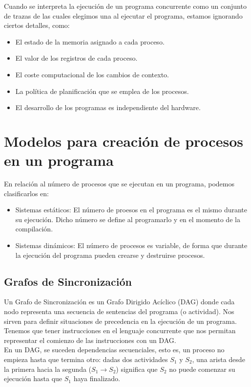 \noindent
Cuando se interpreta la ejecución de un programa concurrente como un conjunto de trazas de las cuales elegimos una al ejecutar el programa, estamos ignorando ciertos detalles, como:
\begin{itemize}
    \item El estado de la memoria asignado a cada proceso.
    \item El valor de los registros de cada proceso.
    \item El coste computacional de los cambios de contexto.
    \item La política de planificación que se emplea de los procesos.
    \item El desarrollo de los programas es independiente del hardware.
\end{itemize}

\section{Modelos para creación de procesos en un programa}
En relación al número de procesos que se ejecutan en un programa, podemos clasificarlos en:
\begin{itemize}
    \item Sistemas estáticos: El número de proesos en el programa es el mismo durante su ejecución. Dicho número se define al programarlo y en el momento de la compilación.
    \item Sistemas dinámicos: El número de procesos es variable, de forma que durante la ejecución del programa pueden crearse y destruirse procesos.
\end{itemize}

\subsection{Grafos de Sincronización}
Un Grafo de Sincronización es un Grafo Dirigido Acíclico (DAG) donde cada nodo representa una secuencia de sentencias del programa (o actividad). Nos sirven para definir situaciones de precedencia en la ejecución de un programa. Tenemos que tener instrucciones en el lenguaje concurrente que nos permitan representar el comienzo de las instrucciones con un DAG\@.\\

En un DAG, se suceden dependencias secuenciales, esto es, un proceso no empieza hasta que termina otro: dadas dos actividades $S_1$ y $S_2$, una arista desde la primera hacia la segunda ($S_1\rightarrow S_2$) significa que $S_2$ no puede comenzar su ejecución hasta que $S_1$ haya finalizado.\\

